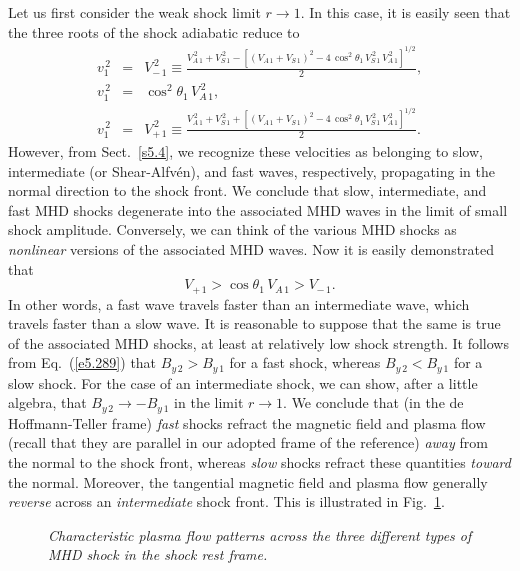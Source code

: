 Let us first consider the weak shock limit $r\rightarrow 1$. In this case, it is easily seen that the three roots of the
shock adiabatic reduce to
\begin{eqnarray}
v_1^{\,2} &=&V_{-\,1}^{\,2}\equiv \frac{V_{A\,1}^{\,2}+V_{S\,1}^{\,2}- [(V_{A\,1}+V_{S\,1})^2
-4\,\cos^2\theta_1\,V_{S\,1}^{\,2}\,V_{A\,1}^{\,2}]^{1/2}}{2},\\[0.5ex]
v_1^{\,2} &=& \cos^2\theta_1\,V_{A\,1}^{\,2},\\[0.5ex]
v_1^{\,2} &=&V_{+\,1}^{\,2}\equiv \frac{V_{A\,1}^{\,2}+V_{S\,1}^{\,2} + [(V_{A\,1}+V_{S\,1})^2
-4\,\cos^2\theta_1\,V_{S\,1}^{\,2}\,V_{A\,1}^{\,2}]^{1/2}}{2}.
\end{eqnarray}
However, from Sect.~\ref{s5.4}, we recognize these velocities as belonging to slow, intermediate
(or Shear-Alfv\'{e}n), and fast waves, respectively, propagating in the normal direction to the
shock front. We conclude that slow, intermediate, and fast MHD shocks degenerate into the
associated MHD waves in the limit of small shock amplitude. Conversely, we can think of
the various MHD shocks as {\em nonlinear}\/ versions of the associated MHD waves. Now it is easily demonstrated that
\begin{equation}
V_{+\,1}> \cos\theta_1\,V_{A\,1}> V_{-\,1}.
\end{equation}
In other words, a fast wave travels faster than an intermediate wave, which travels faster than a slow
wave. It is reasonable to suppose that the same is true of the associated MHD
shocks, at least at relatively low shock strength.
It follows from Eq.~(\ref{e5.289}) that $B_{y\,2}>B_{y\,1}$ for a fast shock,
whereas $B_{y\,2}<B_{y\,1}$ for a slow  shock. For the case of an intermediate shock, we
can show, after a little algebra, that $B_{y\,2}\rightarrow -B_{y\,1}$ in the limit
$r\rightarrow 1$.  We conclude that (in the de Hoffmann-Teller frame) {\em fast}\/ shocks refract the magnetic field and plasma
flow (recall that they are parallel in our adopted frame of the reference) {\em away}\/ from
the normal to the shock front, whereas {\em slow}\/ shocks refract these quantities {\em toward}\/
the normal. Moreover, the tangential magnetic field and plasma flow generally {\em reverse}\/
across an {\em intermediate}\/ shock front. This is illustrated in Fig.~\ref{f30a}.

\begin{figure}
\epsfysize=2.5in
\centerline{}
\caption{\em Characteristic plasma flow patterns across the three different types of MHD shock
in the shock rest frame.}\label{f30a}
\end{figure}

